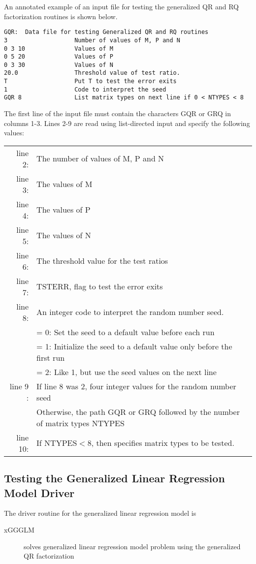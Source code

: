 \dent
An annotated example of an input file for testing the generalized
QR and RQ factorization routines is shown below.
\begin{verbatim}
GQR:  Data file for testing Generalized QR and RQ routines
3                   Number of values of M, P and N
0 3 10              Values of M 
0 5 20              Values of P 
0 3 30              Values of N
20.0                Threshold value of test ratio.
T                   Put T to test the error exits
1                   Code to interpret the seed
GQR 8               List matrix types on next line if 0 < NTYPES < 8 
\end{verbatim}

The first line of the input file must contain the characters GQR or GRQ
in columns 1-3.  Lines 2-9 are read using list-directed input and
specify the following values:

\begin{tabular}{r l}
\\
line 2: & The number of values of M, P and N \\
line 3: & The values of M \\
line 4: & The values of P \\
line 5: & The values of N \\
line 6: & The threshold value for the test ratios \\
line 7: &  TSTERR, flag to test the error exits \\
line 8: &  An integer code to interpret the random number seed. \\
        &  = 0:  Set the seed to a default value before each run \\
        &  = 1:  Initialize the seed to a default value only before the first run\\
        &  = 2:  Like 1, but use the seed values on the next line \\
line 9 :&  If line 8 was 2, four integer values for the random number seed \\
        &  Otherwise, the path GQR or GRQ followed by the number of matrix types NTYPES \\
line 10: &  If $\mbox{NTYPES} < 8$, then specifies matrix types to be tested.
\end{tabular}

\subsection{Testing the Generalized Linear Regression Model Driver}
\dent
The driver routine for the generalized linear regression model is
\begin{description}
\item[xGGGLM] solves generalized linear regression model problem using
the generalized QR factorization 
\end{description}

